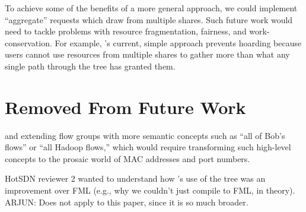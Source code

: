 To achieve some of the benefits of a more general approach, we could
implement ``aggregate'' requests which draw from multiple shares. Such
future work would need to tackle problems with resource fragmentation,
fairness, and work-conservation.  For example, \sys's current, simple
approach prevents hoarding because users cannot use resources from
multiple shares to gather more than what any single path through the
tree has granted them.

\chapter{Removed From Future Work}

 and extending
flow groups with more semantic concepts such as ``all of Bob's flows'' or
``all Hadoop flows,'' which would require transforming such high-level
concepts to the prosaic world of MAC addresses and port numbers.

\begin{comment}

What do we keep doing with \sys?

\begin{itemize}
\item supporting rules which require two operators to override them, or similar
features that would have helped prevent the famous Amazon datacenter
mis-configuration.
\item better change-impact analysis
\item supporting flexibility in rules, such as ``do this before 8pm tonight''
\item in-network services (middleboxes?) ... are these more abstract than 
waypoint and avoid?
or do waypoint and avoid already cover them? we will want to integrate
efforts to build middlebox APIs, such as from Aaron Gember in HotNets 2012
\end{itemize}

\end{comment}

{\color{red} HotSDN reviewer 2 wanted to understand how \sys's use of
  the tree was an improvement over FML (e.g., why we couldn't just
  compile to FML, in theory). ARJUN: Does not apply to this paper,
  since it is so much broader.}

